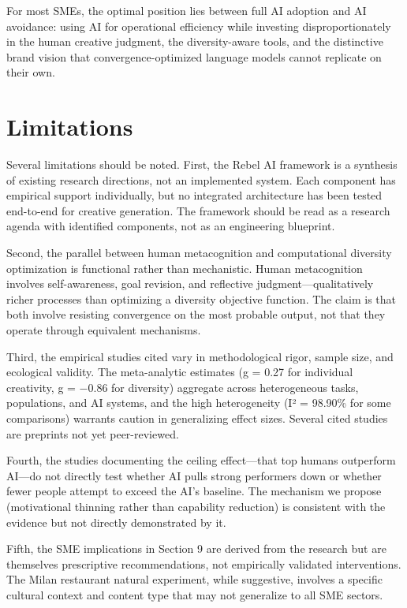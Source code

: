 \documentclass[12pt,a4paper]{article}
\begin{document}
For most SMEs, the optimal position lies between full AI adoption and AI avoidance: using AI for operational efficiency while investing disproportionately in the human creative judgment, the diversity-aware tools, and the distinctive brand vision that convergence-optimized language models cannot replicate on their own.

\section{Limitations}
Several limitations should be noted. First, the Rebel AI framework is a synthesis of existing research directions, not an implemented system. Each component has empirical support individually, but no integrated architecture has been tested end-to-end for creative generation. The framework should be read as a research agenda with identified components, not as an engineering blueprint.

Second, the parallel between human metacognition and computational diversity optimization is functional rather than mechanistic. Human metacognition involves self-awareness, goal revision, and reflective judgment---qualitatively richer processes than optimizing a diversity objective function. The claim is that both involve resisting convergence on the most probable output, not that they operate through equivalent mechanisms.

Third, the empirical studies cited vary in methodological rigor, sample size, and ecological validity. The meta-analytic estimates (g = 0.27 for individual creativity, g = $-$0.86 for diversity) aggregate across heterogeneous tasks, populations, and AI systems, and the high heterogeneity (I² = 98.90\% for some comparisons) warrants caution in generalizing effect sizes. Several cited studies are preprints not yet peer-reviewed.

Fourth, the studies documenting the ceiling effect---that top humans outperform AI---do not directly test whether AI pulls strong performers down or whether fewer people attempt to exceed the AI's baseline. The mechanism we propose (motivational thinning rather than capability reduction) is consistent with the evidence but not directly demonstrated by it.

Fifth, the SME implications in Section 9 are derived from the research but are themselves prescriptive recommendations, not empirically validated interventions. The Milan restaurant natural experiment, while suggestive, involves a specific cultural context and content type that may not generalize to all SME sectors.
\end{document}

